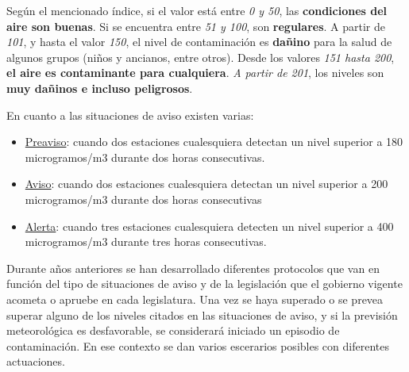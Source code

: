  Según el mencionado índice, si el valor está entre \textit{0 y 50}, las \textbf{condiciones del aire son buenas}. Si se encuentra entre \textit{51 y 100}, son \textbf{regulares}. A partir de \textit{101}, y hasta el valor \textit{150}, el nivel de contaminación es \textbf{dañino} para la salud de algunos grupos (niños y ancianos, entre otros). Desde los valores \textit{151 hasta 200}, \textbf{el aire es contaminante para cualquiera}. \textit{A partir de 201}, los niveles son \textbf{muy dañinos e incluso peligrosos}.

En cuanto a las  situaciones de aviso existen varias: 
\begin{itemize}
	\item \underline{Preaviso}: cuando dos estaciones cualesquiera detectan un nivel superior a 180 microgramos/m3 durante dos horas consecutivas.
	\item \underline{Aviso}: cuando dos estaciones cualesquiera detectan un nivel superior a 200 microgramos/m3 durante dos horas consecutivas
	\item \underline{Alerta}: cuando tres estaciones cualesquiera detecten un nivel superior a 400 microgramos/m3 durante tres horas consecutivas.
\end{itemize}

Durante años anteriores se han desarrollado diferentes protocolos que van en función del tipo de situaciones de aviso y de la legislación que el gobierno vigente acometa o apruebe en cada legislatura. Una vez se haya superado o se prevea superar alguno de los niveles citados en las situaciones de aviso, y si la previsión meteorológica es desfavorable, se considerará iniciado un episodio de contaminación. En ese contexto se dan varios escerarios posibles con diferentes actuaciones.


